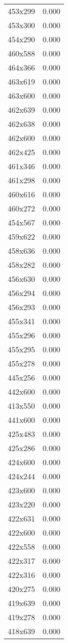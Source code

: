 \begin{table}
\begin{tabular}{lr}
453x299 & 0.000 \\
453x300 & 0.000 \\
454x290 & 0.000 \\
460x588 & 0.000 \\
464x366 & 0.000 \\
463x619 & 0.000 \\
463x600 & 0.000 \\
462x639 & 0.000 \\
462x638 & 0.000 \\
462x600 & 0.000 \\
462x425 & 0.000 \\
461x346 & 0.000 \\
461x298 & 0.000 \\
460x616 & 0.000 \\
460x272 & 0.000 \\
454x567 & 0.000 \\
459x622 & 0.000 \\
458x636 & 0.000 \\
458x282 & 0.000 \\
456x630 & 0.000 \\
456x294 & 0.000 \\
456x293 & 0.000 \\
455x341 & 0.000 \\
455x296 & 0.000 \\
455x295 & 0.000 \\
455x278 & 0.000 \\
445x256 & 0.000 \\
442x600 & 0.000 \\
413x550 & 0.000 \\
441x600 & 0.000 \\
425x483 & 0.000 \\
425x286 & 0.000 \\
424x600 & 0.000 \\
424x244 & 0.000 \\
423x600 & 0.000 \\
423x220 & 0.000 \\
422x631 & 0.000 \\
422x600 & 0.000 \\
422x558 & 0.000 \\
422x317 & 0.000 \\
422x316 & 0.000 \\
420x275 & 0.000 \\
419x639 & 0.000 \\
419x278 & 0.000 \\
418x639 & 0.000 \\

\end{tabular}
\end{table}
